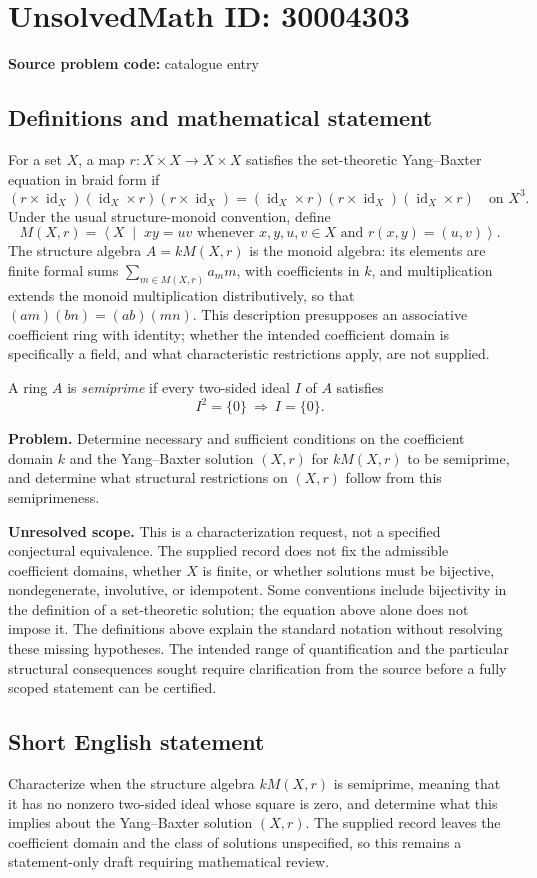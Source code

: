 \documentclass[11pt]{article}
\begin{document}
\section*{UnsolvedMath ID: 30004303}
\textbf{Source problem code:} catalogue entry
\subsection{Definitions and mathematical statement}
For a set \(X\), a map \(r\colon X\times X\to X\times X\) satisfies the set-theoretic Yang--Baxter equation in braid form if
\[
(r\times\operatorname{id}_X)(\operatorname{id}_X\times r)(r\times\operatorname{id}_X)
=
(\operatorname{id}_X\times r)(r\times\operatorname{id}_X)(\operatorname{id}_X\times r)
\quad\text{on }X^3.
\]
Under the usual structure-monoid convention, define
\[
M(X,r)=\left\langle X\;\middle|\;xy=uv\text{ whenever }x,y,u,v\in X\text{ and }r(x,y)=(u,v)\right\rangle.
\]
The structure algebra \(A=kM(X,r)\) is the monoid algebra: its elements are finite formal sums \(\sum_{m\in M(X,r)}a_m m\), with coefficients in \(k\), and multiplication extends the monoid multiplication distributively, so that \((a m)(b n)=(ab)(mn)\). This description presupposes an associative coefficient ring with identity; whether the intended coefficient domain is specifically a field, and what characteristic restrictions apply, are not supplied.

A ring \(A\) is \emph{semiprime} if every two-sided ideal \(I\) of \(A\) satisfies
\[
I^2=\{0\}\ \Longrightarrow\ I=\{0\}.
\]

\textbf{Problem.} Determine necessary and sufficient conditions on the coefficient domain \(k\) and the Yang--Baxter solution \((X,r)\) for \(kM(X,r)\) to be semiprime, and determine what structural restrictions on \((X,r)\) follow from this semiprimeness.

\textbf{Unresolved scope.} This is a characterization request, not a specified conjectural equivalence. The supplied record does not fix the admissible coefficient domains, whether \(X\) is finite, or whether solutions must be bijective, nondegenerate, involutive, or idempotent. Some conventions include bijectivity in the definition of a set-theoretic solution; the equation above alone does not impose it. The definitions above explain the standard notation without resolving these missing hypotheses. The intended range of quantification and the particular structural consequences sought require clarification from the source before a fully scoped statement can be certified.
\subsection{Short English statement}
Characterize when the structure algebra \(kM(X,r)\) is semiprime, meaning that it has no nonzero two-sided ideal whose square is zero, and determine what this implies about the Yang--Baxter solution \((X,r)\). The supplied record leaves the coefficient domain and the class of solutions unspecified, so this remains a statement-only draft requiring mathematical review.
\end{document}
